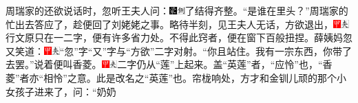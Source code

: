 周瑞家的还欲说话时，忽听王夫人问：{\includegraphics[width=3mm]{../Images/00006}\includegraphics[width=3mm]{../Images/00011}\footnotesize \kaishu 了结得齐整。}“是谁在里头？”周瑞家的忙出去答应了，趁便回了刘姥姥之事。略待半刻，见王夫人无话，方欲退出，{\includegraphics[width=3mm]{../Images/00002}\includegraphics[width=3mm]{../Images/00012}\footnotesize \kaishu 行文原只在一二字，便有许多省力处。不得此窍者，便在窗下百般扭捏。}薛姨妈忽又笑道：{\includegraphics[width=3mm]{../Images/00002}\includegraphics[width=3mm]{../Images/00012}\footnotesize \kaishu “忽”字“又”字与“方欲”二字对射。}“你且站住。我有一宗东西，你带了去罢。”说着便叫香菱。{\includegraphics[width=3mm]{../Images/00002}\includegraphics[width=3mm]{../Images/00012}\footnotesize \kaishu 二字仍从“莲”上起来。盖“英莲”者，“应怜”也，“香菱”者亦“相怜”之意。此是改名之“英莲”也。}帘栊响处，方才和金钏儿顽的那个小女孩子进来了，问：“奶奶